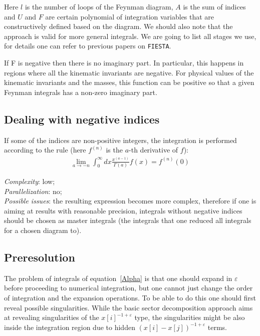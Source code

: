 \documentclass[preprint,12pt]{elsarticle}
\newcommand{\ep}{\varepsilon}
\begin{document}
Here $l$ is the number of loops of the Feynman diagram, $A$ is the sum of indices and $U$ and $F$ are certain polynomial of integration variables that are constructively defined based on the diagram. We should also note that the approach is valid for more general integrals. We are going to list all stages we use, for details one can refer to previous papers on {\tt FIESTA}.

If F is negative then there is no imaginary part. In particular, this happens in regions where all the kinematic invariants are negative. For physical values of the kinematic invariants and the masses, this function can be positive so that a given Feynman integrals has a non-zero imaginary part.

\subsection{Dealing with negative indices}

If some of the indices are non-positive integers, the integration is performed according to the rule (here $f^{(n)}$ is the $a$-th derivative of $f$):
\begin{eqnarray}
\lim_{a\rightarrow -n} \int_{0}^{\infty}d x \frac{x^{(a-1)}}{\Gamma(a)} f(x) = f^{(n)} (0)
\label{negative}
\end{eqnarray}

\textit{Complexity}: low;\\\indent
\textit{Parallelization}: no;\\\indent
\textit{Possible issues}: the resulting expression becomes more complex, therefore if one is aiming at results with reasonable precision, integrals without negative indices should be chosen as master integrals (the integrals that one reduced all integrals for a chosen diagram to).

\subsection{Preresolution}

The problem of integrals of equation~\ref{Alpha} is that one should expand in $\ep$ before proceeding to numerical integration, but one cannot just change the order of integration and the expansion operations. To be able to do this one should first reveal possible singularities. While the basic sector decomposition approach aims at revealing singularities of the $x[i]^{-1+\ep}$ type, the singularities might be also inside the integration region due to hidden $(x[i]-x[j])^{-1+\ep}$ terms.
\end{document}
